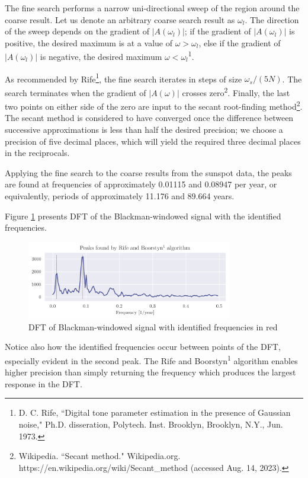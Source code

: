\documentclass[a4paper, 11pt]{article}
\begin{document}
The fine search performs a narrow uni-directional sweep of the region around the
coarse result. Let us denote an arbitrary coarse search result as $\omega_l$.
The direction of the sweep depends on the gradient of $|A(\omega_l)|$; if the
gradient of $|A(\omega_l)|$ is positive, the desired maximum is at a value of
$\omega>\omega_l$, else if the gradient of $|A(\omega_l)|$ is negative, the
desired maximum $\omega<\omega_l$\textsuperscript{1}.

As recommended by Rife\footnote{D. C. Rife, ``Digital tone parameter estimation
in the presence of Gaussian noise," Ph.D. disseration, Polytech. Inst. Brooklyn,
Brooklyn, N.Y., Jun. 1973.}, the fine search iterates in steps of size
$\omega_s/(5N)$. The search terminates when the gradient of $|A(\omega)|$
crosses zero\textsuperscript{2}. Finally, the last two points on either side of
the zero are input to the secant root-finding method\footnote{Wikipedia.
``Secant method." Wikipedia.org. https://en.wikipedia.org/wiki/Secant\_method
(accessed Aug. 14, 2023).}. The secant method is considered to have converged
once the difference between successive approximations is less than half the
desired precision; we choose a precision of five decimal places, which will
yield the required three decimal places in the reciprocals.

Applying the fine search to the coarse results from the sunspot data, the peaks
are found at frequencies of approximately 0.01115 and 0.08947 per year, or
equivalently, periods of approximately 11.176 and 89.664 years.

\newpage

Figure \ref{fig:q8_searchresults} presents DFT of the Blackman-windowed signal
with the identified frequencies.

\begin{figure}[ht]
    \centering
    \includegraphics[width=0.8\textwidth]{images/q8_searchresults.png}
    \caption{DFT of Blackman-windowed signal with identified frequencies in red}
    \label{fig:q8_searchresults}
\end{figure}

Notice also how the identified frequencies occur between points of the DFT,
especially evident in the second peak. The Rife and Boorstyn\textsuperscript{1}
algorithm enables higher precision than simply returning the frequency which
produces the largest response in the DFT.
\end{document}
